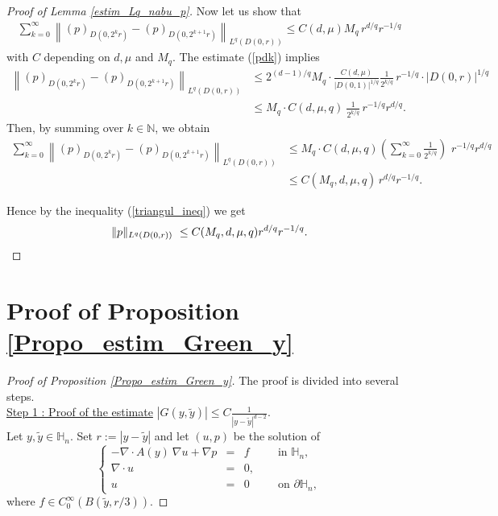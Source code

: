 \documentclass[11pt, reqno]{amsart}
\theoremstyle{definition}
\theoremstyle{remark}
\numberwithin{equation}{section}
\begin{document}
\begin{appendices}
\begin{proof}[Proof of \textup{Lemma \ref{estim_Lq_nabu_p}}]
	\noindent Now  let us show that 
	\begin{align*}
		\sum^\infty_{k=0}    \left\| (p)_{D(0,2^k r)} -  (p)_{D(0,2^{k+1} r)}   \right\|_{L^q( D(0,r))}   \leq   C(d,\mu) M_q \,r^{d/q}r^{-1/q}
	\end{align*}
	with $C$ depending on $d,\mu$ and  $M_q$. The estimate (\ref{pdk})  implies 
	\begin{align*}
		\left\|   (p)_{D(0,2^k r)} -  (p)_{D(0,2^{k+1} r)}   \right\|_{L^q( D(0,r))}
		&\leq 2^{(d-1)/q}M_q\cdot \frac{C(d,\mu)}{| D(0, 1 )|^{1/q}} \frac{1}{2^{k/q}} 
		\,r^{-1/q}\cdot |D(0,r)|^{1/q}\\
		&\leq  M_q \cdot C(d,\mu,q)\ \frac{1}{2^{k/q}} 
		\,r^{-1/q} r^{d/q}. 
	\end{align*}
	Then, by summing over $k\in\mathbb{N}$, we obtain
	\begin{align*}
		\sum^\infty_{k=0} \left\| (p)_{D(0,2^k r)} -  (p)_{D(0,2^{k+1} r)}   \right\|_{L^q( D(0,r))}
		&\leq M_q\cdot C(d,\mu,q)  \left( \sum^\infty_{k=0}  \frac{1}{2^{k/q}} \right) 
		\, \,r^{-1/q} r^{d/q}  \\
		&\leq C(M_q, d,\mu,q) \, r^{d/q}r^{-1/q}.
	\end{align*}
	
	\noindent Hence by the inequality (\ref{triangul_ineq})	 we get 
	\begin{align*}
		\|	p\|_{L^q(D(0,r))}\
		\leq \;  &   C(M_q, d,\mu,q) r^{d/q}r^{-1/q}. \qedhere\\
\end{align*}	\end{proof}
	
	
	
	\section{Proof of Proposition \ref{Propo_estim_Green_y}}\label{append_Gfunction}
	
	\begin{proof}[Proof of \textup{Proposition \ref{Propo_estim_Green_y}}]
		The proof is divided into several steps.\\
		\noindent  \underline{Step 1 : Proof of the estimate}  $| G(y,\tilde{y})| \leq C  \frac{1 }{|y-\tilde{y}|^{d-2}}.$ \\ 
		\noindent  Let $y,\tilde{y}\in \mathbb{H}_n$. 
		Set $r:=|y-\tilde{y}|$ and let $(u,p)$ be the solution of 
		\begin{equation}\label{system_(u,p)}
			\left\{
			\begin{array}{rcll}
				-\nabla\cdot A(y) \: \nabla u  +  \nabla p&=&  f \;  \quad& \mbox{in } {\mathbb{H}}_n,\\
				\nabla\cdot u&=& 0, \;  \quad & \\
				u&=& 0\quad & \mbox{on } \partial{\mathbb{H}}_n,
			\end{array}
			\right. 
		\end{equation}
		where $f\in C^\infty_0(B(\tilde{y},r/3))$.


\end{proof}
\end{appendices}
\end{document}
